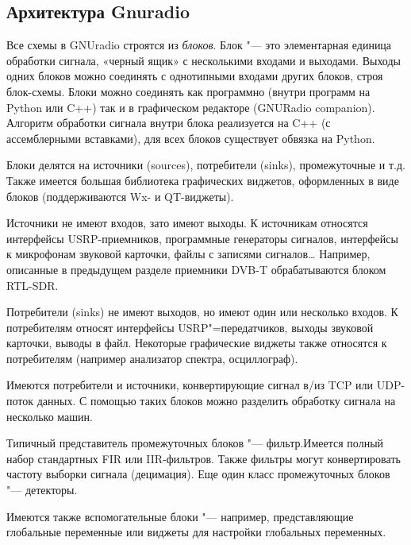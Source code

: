 \documentclass[10pt, a5paper]{article}
\begin{document}
\subsection*{Архитектура Gnuradio}

Все схемы в GNUradio строятся из \emph{блоков}. Блок "--- это элементарная единица обработки сигнала, «черный ящик» с несколькими входами и выходами. Выходы одних блоков можно соединять с однотипными входами других блоков, строя блок-схемы. Блоки можно соединять как программно (внутри программ на Python или C++) так и в графическом редакторе (GNURadio companion). Алгоритм обработки сигнала внутри блока реализуется на C++ (с ассемблерными вставками), для всех блоков существует обвязка на Python.

Блоки делятся на источники (sources), потребители (sinks), промежуточные и т.д. Также имеется большая библиотека графических виджетов, оформленных в виде блоков (поддерживаются Wx- и QT-виджеты).

Источники не имеют входов, зато имеют выходы. К источникам относятся интерфейсы USRP-приемников, программные генераторы сигналов, интерфейсы к микрофонам звуковой карточки, файлы с записями сигналов\ldots{} Например, описанные в предыдущем разделе приемники DVB-T  обрабатываются блоком RTL-SDR.

Потребители (sinks) не имеют выходов, но имеют один или нес\-колько входов. К потребителям относят интерфейсы USRP"=передатчиков, выходы звуковой карточки, выводы в файл. Некоторые графические виджеты также относятся к потребителям (например анализатор спектра, осциллограф).

Имеются потребители и источники, конвертирующие сигнал \linebreak в/из TCP или UDP-поток данных. С помощью таких блоков можно разделить обработку сигнала на несколько машин.

Типичный представитель промежуточных блоков "--- фильтр.\linebreak Имеется полный набор стандартных FIR или IIR-фильтров. Также фильтры могут конвертировать частоту выборки сигнала (децимация). Еще один класс промежуточных блоков "--- детекторы.

Имеются также вспомогательные блоки "--- например, представляющие глобальные переменные или виджеты для настройки глобальных переменных.
\end{document}
